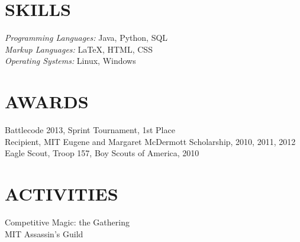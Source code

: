 \documentclass[margin]{res}
\begin{document}
\begin{resume}
\section{SKILLS}    {\sl Programming Languages:} Java, Python, SQL \\
                    {\sl Markup Languages:} \LaTeX, HTML, CSS \\
                    {\sl Operating Systems:} Linux, Windows
 
 
\section{AWARDS}    Battlecode 2013, Sprint Tournament, 1st Place\\
                    Recipient, MIT Eugene and Margaret McDermott Scholarship, 
                    2010, 2011, 2012\\
                    Eagle Scout, Troop 157, Boy Scouts of America, 2010

\section{ACTIVITIES}
                    Competitive Magic: the Gathering\\
                    MIT Assassin's Guild \\

\end{resume}
\end{document}

